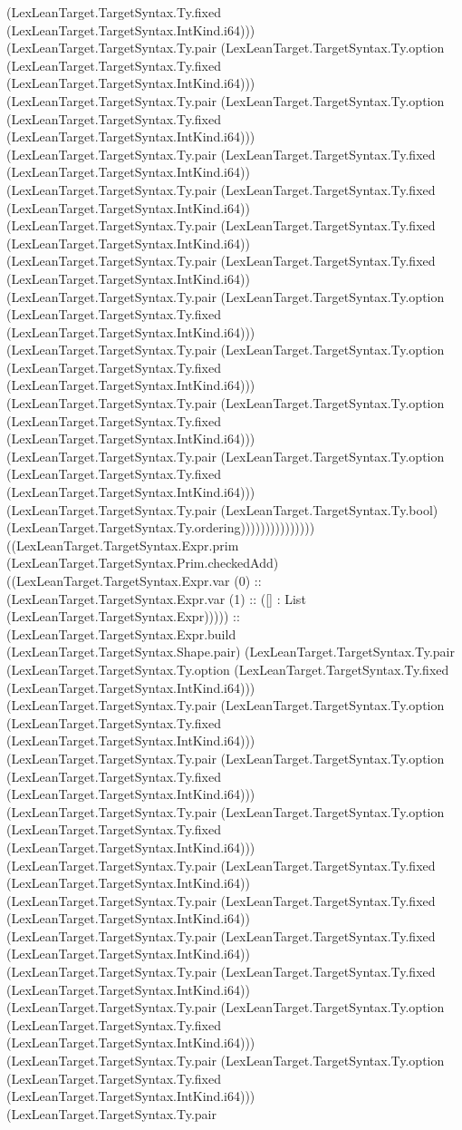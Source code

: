 \documentclass[11pt]{article}
\begin{document}
(LexLeanTarget.TargetSyntax.Ty.fixed (LexLeanTarget.TargetSyntax.IntKind.i64))) (LexLeanTarget.TargetSyntax.Ty.pair (LexLeanTarget.TargetSyntax.Ty.option (LexLeanTarget.TargetSyntax.Ty.fixed (LexLeanTarget.TargetSyntax.IntKind.i64))) (LexLeanTarget.TargetSyntax.Ty.pair (LexLeanTarget.TargetSyntax.Ty.option (LexLeanTarget.TargetSyntax.Ty.fixed (LexLeanTarget.TargetSyntax.IntKind.i64))) (LexLeanTarget.TargetSyntax.Ty.pair (LexLeanTarget.TargetSyntax.Ty.fixed (LexLeanTarget.TargetSyntax.IntKind.i64)) (LexLeanTarget.TargetSyntax.Ty.pair (LexLeanTarget.TargetSyntax.Ty.fixed (LexLeanTarget.TargetSyntax.IntKind.i64)) (LexLeanTarget.TargetSyntax.Ty.pair (LexLeanTarget.TargetSyntax.Ty.fixed (LexLeanTarget.TargetSyntax.IntKind.i64)) (LexLeanTarget.TargetSyntax.Ty.pair (LexLeanTarget.TargetSyntax.Ty.fixed (LexLeanTarget.TargetSyntax.IntKind.i64)) (LexLeanTarget.TargetSyntax.Ty.pair (LexLeanTarget.TargetSyntax.Ty.option (LexLeanTarget.TargetSyntax.Ty.fixed (LexLeanTarget.TargetSyntax.IntKind.i64))) (LexLeanTarget.TargetSyntax.Ty.pair (LexLeanTarget.TargetSyntax.Ty.option (LexLeanTarget.TargetSyntax.Ty.fixed (LexLeanTarget.TargetSyntax.IntKind.i64))) (LexLeanTarget.TargetSyntax.Ty.pair (LexLeanTarget.TargetSyntax.Ty.option (LexLeanTarget.TargetSyntax.Ty.fixed (LexLeanTarget.TargetSyntax.IntKind.i64))) (LexLeanTarget.TargetSyntax.Ty.pair (LexLeanTarget.TargetSyntax.Ty.option (LexLeanTarget.TargetSyntax.Ty.fixed (LexLeanTarget.TargetSyntax.IntKind.i64))) (LexLeanTarget.TargetSyntax.Ty.pair (LexLeanTarget.TargetSyntax.Ty.bool) (LexLeanTarget.TargetSyntax.Ty.ordering))))))))))))))) ((LexLeanTarget.TargetSyntax.Expr.prim (LexLeanTarget.TargetSyntax.Prim.checkedAdd) ((LexLeanTarget.TargetSyntax.Expr.var (0) :: (LexLeanTarget.TargetSyntax.Expr.var (1) :: ([] : List (LexLeanTarget.TargetSyntax.Expr))))) :: (LexLeanTarget.TargetSyntax.Expr.build (LexLeanTarget.TargetSyntax.Shape.pair) (LexLeanTarget.TargetSyntax.Ty.pair (LexLeanTarget.TargetSyntax.Ty.option (LexLeanTarget.TargetSyntax.Ty.fixed (LexLeanTarget.TargetSyntax.IntKind.i64))) (LexLeanTarget.TargetSyntax.Ty.pair (LexLeanTarget.TargetSyntax.Ty.option (LexLeanTarget.TargetSyntax.Ty.fixed (LexLeanTarget.TargetSyntax.IntKind.i64))) (LexLeanTarget.TargetSyntax.Ty.pair (LexLeanTarget.TargetSyntax.Ty.option (LexLeanTarget.TargetSyntax.Ty.fixed (LexLeanTarget.TargetSyntax.IntKind.i64))) (LexLeanTarget.TargetSyntax.Ty.pair (LexLeanTarget.TargetSyntax.Ty.option (LexLeanTarget.TargetSyntax.Ty.fixed (LexLeanTarget.TargetSyntax.IntKind.i64))) (LexLeanTarget.TargetSyntax.Ty.pair (LexLeanTarget.TargetSyntax.Ty.fixed (LexLeanTarget.TargetSyntax.IntKind.i64)) (LexLeanTarget.TargetSyntax.Ty.pair (LexLeanTarget.TargetSyntax.Ty.fixed (LexLeanTarget.TargetSyntax.IntKind.i64)) (LexLeanTarget.TargetSyntax.Ty.pair (LexLeanTarget.TargetSyntax.Ty.fixed (LexLeanTarget.TargetSyntax.IntKind.i64)) (LexLeanTarget.TargetSyntax.Ty.pair (LexLeanTarget.TargetSyntax.Ty.fixed (LexLeanTarget.TargetSyntax.IntKind.i64)) (LexLeanTarget.TargetSyntax.Ty.pair (LexLeanTarget.TargetSyntax.Ty.option (LexLeanTarget.TargetSyntax.Ty.fixed (LexLeanTarget.TargetSyntax.IntKind.i64))) (LexLeanTarget.TargetSyntax.Ty.pair (LexLeanTarget.TargetSyntax.Ty.option (LexLeanTarget.TargetSyntax.Ty.fixed (LexLeanTarget.TargetSyntax.IntKind.i64))) (LexLeanTarget.TargetSyntax.Ty.pair 
\end{document}
